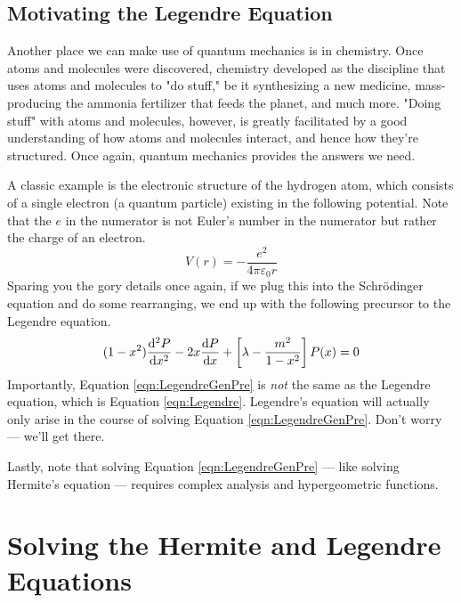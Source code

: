 \documentclass[titlepage]{article}
\numberwithin{equation}{section}
\begin{document}
\subsection{Motivating the Legendre Equation}
Another place we can make use of quantum mechanics is in chemistry. Once atoms and molecules were discovered, chemistry developed as the discipline that uses atoms and molecules to "do stuff," be it synthesizing a new medicine, mass-producing the ammonia fertilizer that feeds the planet, and much more. "Doing stuff" with atoms and molecules, however, is greatly facilitated by a good understanding of how atoms and molecules interact, and hence how they're structured. Once again, quantum mechanics provides the answers we need.\par
A classic example is the electronic structure of the hydrogen atom, which consists of a single electron (a quantum particle) existing in the following potential. Note that the $e$ in the numerator is not Euler's number in the numerator but rather the charge of an electron.
\begin{equation*}
    V(r) = -\frac{e^2}{4\pi\varepsilon_0r}
\end{equation*}
Sparing you the gory details once again, if we plug this into the Schr\"{o}dinger equation and do some rearranging, we end up with the following precursor to the Legendre equation.
\begin{equation}\label{eqn:LegendreGenPre}
    (1-x^2)\dv[2]{P}{x}-2x\dv{P}{x}+\left[ \lambda-\frac{m^2}{1-x^2} \right]P(x) = 0
\end{equation}
Importantly, Equation \ref{eqn:LegendreGenPre} is \emph{not} the same as the Legendre equation, which is Equation \ref{eqn:Legendre}. Legendre's equation will actually only arise in the course of solving Equation \ref{eqn:LegendreGenPre}. Don't worry --- we'll get there.\par
Lastly, note that solving Equation \ref{eqn:LegendreGenPre} --- like solving Hermite's equation --- requires complex analysis and hypergeometric functions.
\newpage



\section{Solving the Hermite and Legendre Equations}\label{sse:solving}
\end{document}
